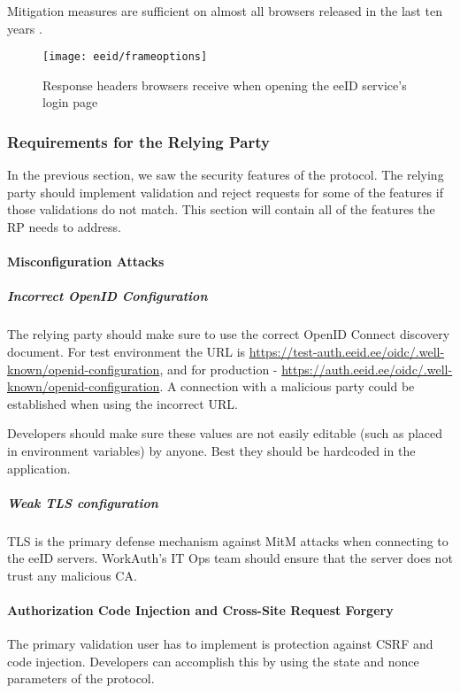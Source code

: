 Mitigation measures are sufficient on almost all browsers released in the last ten years \cite{caniuse-xframeoptions}.

\begin{figure}
  \centering
  \texttt{[image: eeid/frameoptions]}
  \caption{Response headers browsers receive when opening the eeID service's login page}
  \label{fig:eeid-responseheaders}
\end{figure}

\subsubsection{Requirements for the Relying Party}

In the previous section, we saw the security features of the protocol. The relying party should implement validation and reject requests for some of the features if those validations do not match. This section will contain all of the features the RP needs to address.

\paragraph{Misconfiguration Attacks}

\subparagraph{Incorrect OpenID Configuration}

The relying party should make sure to use the correct OpenID Connect discovery document. For test environment the URL is \url{https://test-auth.eeid.ee/oidc/.well-known/openid-configuration}, and for production - \url{https://auth.eeid.ee/oidc/.well-known/openid-configuration}. A connection with a malicious party could be established when using the incorrect URL.

Developers should make sure these values are not easily editable (such as placed in environment variables) by anyone. Best they should be hardcoded in the application.

\subparagraph{Weak TLS configuration}

TLS is the primary defense mechanism against MitM attacks when connecting to the eeID servers. WorkAuth's IT Ops team should ensure that the server does not trust any malicious CA.

\paragraph{Authorization Code Injection and Cross-Site Request Forgery}

The primary validation user has to implement is protection against CSRF and code injection. Developers can accomplish this by using the state and nonce parameters of the protocol.


